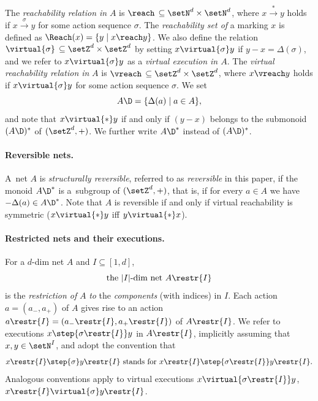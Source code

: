 The \emph{reachability relation in} $A$ 
is $\reach\,\subseteq\setN^d\times\setN^d$, where
$x\xrightarrow{*}y$ holds if $x\xrightarrow{\sigma}y$ for some
action sequence $\sigma$. The \emph{reachability set of} a marking $x$
is defined as $\Reach(x)=\{y\mid x\reach y\}$.
We also define the relation $\virtual{\sigma}\, \subseteq
\setZ^d\times\setZ^d$ by setting $x\virtual{\sigma}y$ if
$y-x=\Delta(\sigma)$,
and we refer to  $x\virtual{\sigma}y$ as a \emph{virtual execution in $A$}.
The \emph{virtual reachability relation in} $A$ 
is $\vreach\,\subseteq\setZ^d\times\setZ^d$, where
$x\vreach y$ holds if $x\virtual{\sigma}y$ for some
action sequence $\sigma$.
 We set
\[A\D=\{\Delta(a)\mid a\in A\},\]
and note that 
 $x\virtual{*} y$ if and only if $(y-x)$ belongs to the submonoid $(A\D)^*$ of
 $(\setZ^d,+)$.
We further write $A\D^*$ instead of $(A\D)^*$.

\paragraph{Reversible nets.}
A~net $A$ is 
\emph{structurally reversible}, referred to as \emph{reversible} in this
paper, if the monoid $A\D^*$ is a~subgroup of $(\setZ^d,+)$, that is, if for every
$a\in A$ we have $-\Delta(a)\in A\D^*$.
Note that $A$ is reversible if and only if
 virtual reachability is symmetric ($x\virtual{*}y$ iff
$y\virtual{*}x$).

\paragraph{Restricted nets and their executions.}
For a $d$-dim net $A$ and $I\subseteq [1,d]$, 
\begin{equation*}
	\textnormal{the $|I|$-dim net $A\restr{I}$}
\end{equation*}
	is the \emph{restriction of} $A$ \emph{to} the
	\emph{components} (with indices)  in $I$.
	Each action $a=(a_-,a_+)$ of $A$
	gives rise to an action
	$a\restr{I}=({a_-}\restr{I},{a_+}\restr{I})$ of $A\restr{I}$.
We refer to 
executions 
$x\step{\sigma\restr{I}}y$ in $A\restr{I}$,  implicitly assuming 
that $x,y\in\setN^I$, and
adopt the convention that
\begin{equation*}
	\textnormal{$x\restr{I}\step{\sigma}y\restr{I}$ stands for
	$x\restr{I}\step{\sigma\restr{I}}y\restr{I}$.} 
\end{equation*}
Analogous conventions apply to virtual executions
$x\virtual{\sigma\restr{I}}y$, 
$x\restr{I}\virtual{\sigma}y\restr{I}$.

